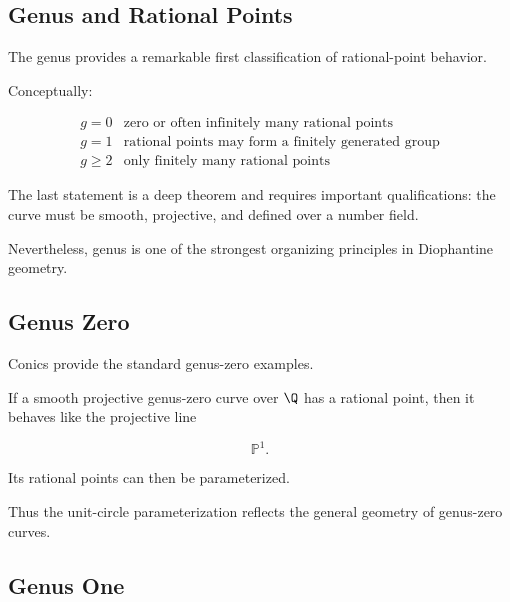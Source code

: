 \subsection{Genus and Rational Points}
\label{subsec:genus-rational-points}

The genus provides a remarkable first classification of rational-point
behavior.

Conceptually:

\[
\boxed{
\begin{array}{c|c}
g=0 & \text{zero or often infinitely many rational points}\\
g=1 & \text{rational points may form a finitely generated group}\\
g\geq2 & \text{only finitely many rational points}
\end{array}
}
\]

The last statement is a deep theorem and requires important qualifications:
the curve must be smooth, projective, and defined over a number field.

Nevertheless, genus is one of the strongest organizing principles in
Diophantine geometry.

\subsection{Genus Zero}
\label{subsec:genus-zero-curves}

Conics provide the standard genus-zero examples.

If a smooth projective genus-zero curve over \(\Q\) has a rational point,
then it behaves like the projective line

\[ \mathbb P^1. \]

Its rational points can then be parameterized.

Thus the unit-circle parameterization reflects the general geometry of
genus-zero curves.

\subsection{Genus One}
\label{subsec:genus-one-curves}

